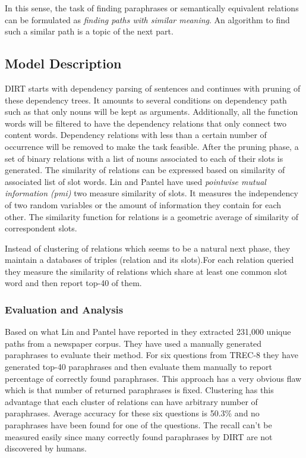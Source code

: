       
    In this sense, the task of finding paraphrases or semantically equivalent relations
     can be formulated as \emph{finding paths with similar meaning}. 
     An algorithm to find such a similar path is a topic of the next part.

\subsection{Model Description}
\label{ssec:dirt-model} 
DIRT starts with dependency parsing of sentences and continues with pruning of these dependency trees.
It amounts to several conditions on dependency path such as that only nouns will be kept as arguments. 
Additionally, all the function words will be filtered to have the dependency relations that only connect
two content words. Dependency relations with less than a certain number of occurrence will be removed to make the task feasible.
After the pruning phase, a set of binary relations with a list of nouns associated to each of their slots is generated. 
The similarity of relations can be expressed based on similarity of associated list of slot words. Lin and Pantel
have used \emph{pointwise mutual information (pmi)} two measure similarity of slots. 
It measures the independency of two random variables or the amount of
information they contain for each other. The similarity function for relations  is a geometric average
of similarity of correspondent slots.

Instead of clustering of relations which seems to be a natural next phase,
 they maintain a databases of triples (relation and its slots).For each relation queried
  they measure the similarity of relations which share at least one common slot word and then report top-40 of them.
  
\subsubsection{Evaluation and Analysis}
\label{ssec:dirt-model} 
  
  Based on what Lin and Pantel have reported in \cite{Lin2001} they extracted 231,000 unique paths from a newspaper corpus.
  They have used a manually generated paraphrases to evaluate their method. For six questions from TREC-8 
  they have generated top-40 paraphrases and then evaluate them manually to report percentage of correctly found paraphrases.
  This approach has a very obvious flaw which is that number of returned paraphrases is fixed. Clustering has this 
  advantage that each cluster of relations can have arbitrary number of paraphrases.
  Average accuracy for these six questions is 50.3\% and no paraphrases have been found for one of the questions.
  The recall can't be measured easily since many correctly found paraphrases by DIRT are not discovered by humans.
  
